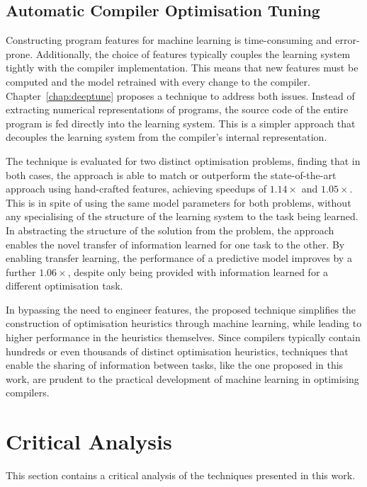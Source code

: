 \subsection{Automatic Compiler Optimisation Tuning}

Constructing program features for machine learning is time-consuming and error-prone. Additionally, the choice of features typically couples the learning system tightly with the compiler implementation. This means that new features must be computed and the model retrained with every change to the compiler. Chapter~\ref{chap:deeptune} proposes a technique to address both issues. Instead of extracting numerical representations of programs, the source code of the entire program is fed directly into the learning system. This is a simpler approach that decouples the learning system from the compiler's internal representation.

The technique is evaluated for two distinct optimisation problems, finding that in both cases, the approach is able to match or outperform the state-of-the-art approach using hand-crafted features, achieving speedups of $1.14\times$ and $1.05\times$. This is in spite of using the same model parameters for both problems, without any specialising of the structure of the learning system to the task being learned. In abstracting the structure of the solution from the problem, the approach enables the novel transfer of information learned for one task to the other. By enabling transfer learning, the performance of a predictive model improves by a further $1.06\times$, despite only being provided with information learned for a different optimisation task.

In bypassing the need to engineer features, the proposed technique simplifies the construction of optimisation heuristics through machine learning, while leading to higher performance in the heuristics themselves. Since compilers typically contain hundreds or even thousands of distinct optimisation heuristics, techniques that enable the sharing of information between tasks, like the one proposed in this work, are prudent to the practical development of machine learning in optimising compilers.


\section{Critical Analysis}
\label{sec:conclusions-critical-analysis}

This section contains a critical analysis of the techniques presented in this work.


